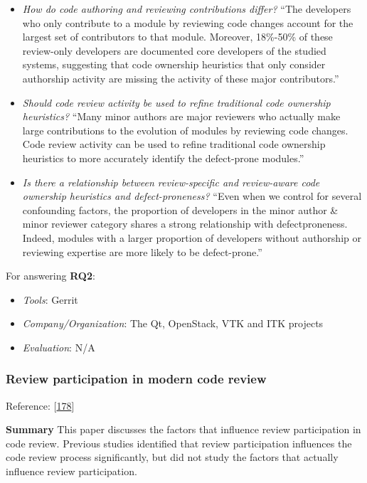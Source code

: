 \documentclass[]{book}
\providecommand{\tightlist}{%
  \setlength{\itemsep}{0pt}\setlength{\parskip}{0pt}}
\begin{document}
\begin{itemize}
\item
  \emph{How do code authoring and reviewing contributions differ?} ``The
  developers who only contribute to a module by reviewing code changes
  account for the largest set of contributors to that module. Moreover,
  18\%-50\% of these review-only developers are documented core
  developers of the studied systems, suggesting that code ownership
  heuristics that only consider authorship activity are missing the
  activity of these major contributors.''
\item
  \emph{Should code review activity be used to refine traditional code
  ownership heuristics?} ``Many minor authors are major reviewers who
  actually make large contributions to the evolution of modules by
  reviewing code changes. Code review activity can be used to refine
  traditional code ownership heuristics to more accurately identify the
  defect-prone modules.''
\item
  \emph{Is there a relationship between review-specific and review-aware
  code ownership heuristics and defect-proneness?} ``Even when we
  control for several confounding factors, the proportion of developers
  in the minor author \& minor reviewer category shares a strong
  relationship with defectproneness. Indeed, modules with a larger
  proportion of developers without authorship or reviewing expertise are
  more likely to be defect-prone.''
\end{itemize}

For answering \textbf{RQ2}:

\begin{itemize}
\tightlist
\item
  \emph{Tools}: Gerrit
\item
  \emph{Company/Organization}: The Qt, OpenStack, VTK and ITK projects
\item
  \emph{Evaluation}: N/A
\end{itemize}

\subsubsection{Review participation in modern code
review}\label{review-participation-in-modern-code-review}

Reference: {[}\protect\hyperlink{ref-thongtanunam2017review}{178}{]}

\textbf{Summary} This paper discusses the factors that influence review
participation in code review. Previous studies identified that review
participation influences the code review process significantly, but did
not study the factors that actually influence review participation.
\end{document}
